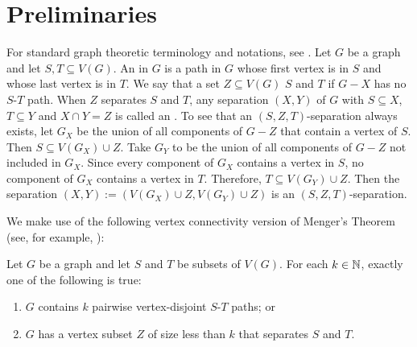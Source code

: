\documentclass{patmorin}
\newcommand{\pat}[1]{\textcolor{Blue}{[Pat: #1]}}
\newcommand{\hussein}[1]{\textcolor{purple}{HH: #1}}
\begin{document}

\section{Preliminaries}

For standard graph theoretic terminology and notations, see \citet{diestel2017graph}.
Let $G$ be a graph and let $S,T\subseteq V(G)$. An  in $G$ is a path in $G$ whose first vertex is in $S$ and whose last vertex is in $T$.  We say that a set $Z\subseteq V(G)$  $S$ and $T$ if $G-X$ has no $S$-$T$ path.  When $Z$ separates $S$ and $T$, any separation $(X,Y)$ of $G$ with $S\subseteq X$, $T\subseteq Y$ and $X\cap Y=Z$ is called an . To see that an $(S,Z,T)$-separation always exists, let $G_X$ be the union of all components of $G-Z$ that contain a vertex of $S$. Then $S\subseteq V(G_X)\cup Z$. Take $G_Y$ to be the union of all components of $G-Z$ not included in $G_X$. Since  every component of $G_X$ contains a vertex in $S$, no component of $G_X$ contains a vertex in $T$.  Therefore, $T\subseteq V(G_Y)\cup Z$.  Then the separation $(X,Y):=(V(G_X)\cup Z, V(G_Y)\cup Z)$ is an $(S,Z,T)$-separation.

We make use of the following vertex connectivity version of Menger's Theorem (see, for example, \citet[Theorem~3.3.1]{diestel2017graph}): \

\begin{thm}\label{menger}
  Let $G$ be a graph and let $S$ and $T$ be subsets of $V(G)$. For each $k\in\mathbb{N}$, exactly one of the following is true:
  \begin{enumerate}[nosep,nolistsep,label=\rm(\roman*),ref=(\roman*)2]
      \item $G$ contains $k$ pairwise vertex-disjoint $S$-$T$ paths; or
      \item $G$ has a vertex subset $Z$ of size less than $k$ that separates $S$ and $T$.
  \end{enumerate}
\end{thm}
\end{document}

